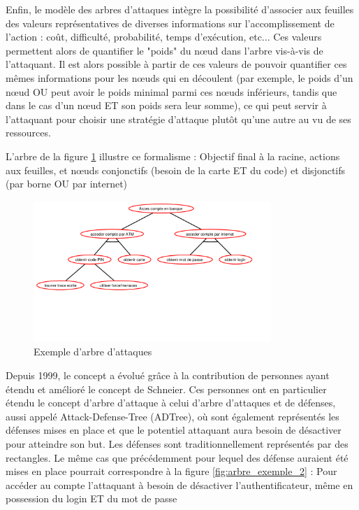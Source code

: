         Enfin, le modèle des arbres d'attaques intègre la possibilité d'associer aux feuilles des valeurs représentatives de diverses informations sur l'accomplissement de l'action : coût, difficulté, probabilité, temps d'exécution, etc... Ces valeurs permettent alors de quantifier le "poids" du nœud dans l'arbre vis-à-vis de l'attaquant.  Il est alors possible à partir de ces valeurs de pouvoir quantifier ces mêmes informations pour les nœuds qui en découlent (par exemple, le poids d'un nœud OU peut avoir le poids minimal parmi ces nœuds inférieurs, tandis que dans le cas d'un nœud ET son poids sera leur somme), ce qui peut servir à l'attaquant pour choisir une stratégie d'attaque plutôt qu'une autre au vu de ses ressources.

		L'arbre de la figure \ref{fig:arbre_exemple_1} illustre ce formalisme : Objectif final à la racine, actions aux feuilles, et nœuds conjonctifs (besoin de la carte ET du code) et disjonctifs (par borne OU par internet) 

		\begin{figure}
			\begin{center}
				\includegraphics[width=0.8\textwidth]{figure/exemple1_rapport.pdf}
			\end{center}
			\caption{Exemple d'arbre d'attaques}
			\label{fig:arbre_exemple_1}
		\end{figure}

		Depuis 1999, le concept a évolué grâce à la contribution de personnes ayant étendu et amélioré le concept de Schneier. 
        Ces personnes ont en particulier étendu le concept d'arbre d'attaque à celui d'arbre d'attaques et de défenses, aussi appelé Attack-Defense-Tree (ADTree), où sont également représentés les défenses mises en place et que le potentiel attaquant aura besoin de désactiver pour atteindre son but. Les défenses sont traditionnellement représentés par des rectangles. Le même cas que précédemment pour lequel des défense auraient été mises en place pourrait correspondre à la figure \ref{fig:arbre_exemple_2} : Pour accéder au compte l'attaquant à besoin de désactiver l'authentificateur, même en possession du login ET du mot de passe

